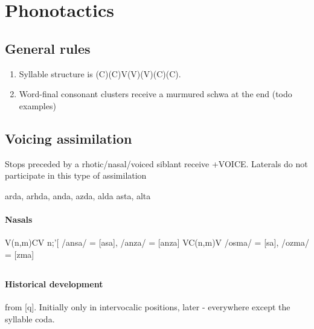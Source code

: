 \documentclass[11pt]{book}
\begin{document}



\section{Phonotactics}
\subsection{General rules}
\begin{enumerate}
	\item Syllable structure is (C)(C)V(V)(V)(C)(C).
	\item Word-final consonant clusters receive a murmured schwa at the end (todo examples)
\end{enumerate}


\subsection{Voicing assimilation}
Stops preceded by a rhotic/nasal/voiced siblant receive +VOICE. Laterals do not participate in this type of assimilation
\begin{exe}
	\ex arda, arhda, anda, azda, alda
	\ex asta, alta
	
\end{exe}

\paragraph{Nasals}

\begin{exe}
\ex V(n,m)CV \textrightarrow n;'[ /ansa/ = [asa], /anza/ = [anza]
\ex VC(n,m)V \textrightarrow /osma/ = [\textopeno sa], /ozma/ = [\textopeno zma] 
\end{exe}

\subsection{}
\paragraph{Historical development} from [q]. Initially only in intervocalic positions, later - everywhere except the syllable coda.
\end{document}
